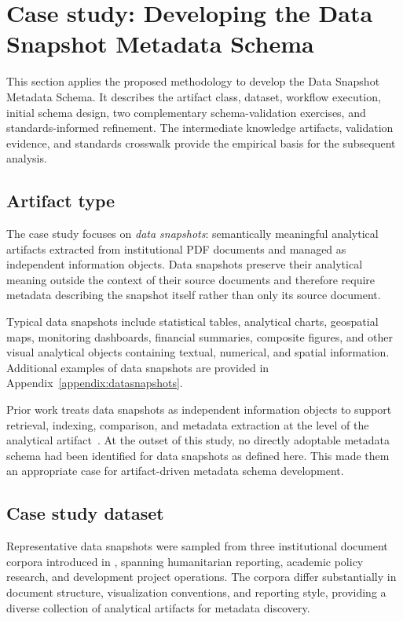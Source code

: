 \documentclass{article}
\begin{document}
\section{Case study: Developing the Data Snapshot Metadata Schema}
\label{sec:case_study}

This section applies the proposed methodology to develop the Data Snapshot Metadata Schema. It describes the artifact class, dataset, workflow execution, initial schema design, two complementary schema-validation exercises, and standards-informed refinement. The intermediate knowledge artifacts, validation evidence, and standards crosswalk provide the empirical basis for the subsequent analysis.

\subsection{Artifact type}

The case study focuses on \emph{data snapshots}: semantically meaningful analytical artifacts extracted from institutional PDF documents and managed as independent information objects. Data snapshots preserve their analytical meaning outside the context of their source documents and therefore require metadata describing the snapshot itself rather than only its source document.

Typical data snapshots include statistical tables, analytical charts, geospatial maps, monitoring dashboards, financial summaries, composite figures, and other visual analytical objects containing textual, numerical, and spatial information. Additional examples of data snapshots are provided in Appendix~\ref{appendix:datasnapshots}.

Prior work treats data snapshots as independent information objects to support retrieval, indexing, comparison, and metadata extraction at the level of the analytical artifact~\citep{dy2026}. At the outset of this study, no directly adoptable metadata schema had been identified for data snapshots as defined here. This made them an appropriate case for artifact-driven metadata schema development.

\subsection{Case study dataset}

Representative data snapshots were sampled from three institutional document corpora introduced in \cite{dy2026}, spanning humanitarian reporting, academic policy research, and development project operations. The corpora differ substantially in document structure, visualization conventions, and reporting style, providing a diverse collection of analytical artifacts for metadata discovery.
\end{document}
